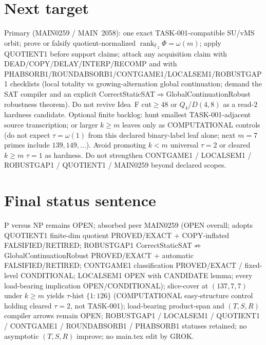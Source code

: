 \documentclass[11pt]{article}
\begin{document}
\section*{Next target}
Primary (MAIN0259 / MAIN~2058): one exact TASK-001-compatible SU/vMS orbit; prove or falsify
quotient-normalized $\operatorname{rank}_{\mathbb F_2}\Phi=\omega(m)$; apply QUOTIENT1 before support claims;
attack any acquisition claim with
DEAD/COPY/DELAY/INTERP/RECOMP and with PHABSORB1/ROUNDABSORB1/CONTGAME1/LOCALSEM1/ROBUSTGAP1 checklists
(local totality vs growing-alternation global continuation; demand the SAT compiler and an
explicit CorrectStaticSAT$\Rightarrow$GlobalContinuationRobust robustness theorem).
Do not revive Idea~F cut$\ge48$ or $Q_4$/$D(4,8)$ as a read-$2$ hardness candidate.
Optional finite backlog: hunt smallest TASK-001-adjacent source transcription;
or larger $k{\ge}m$ leaves only as COMPUTATIONAL controls (do not expect $\tau=\omega(1)$
from this declared binary-label leaf alone; next $m{=}7$ primes include $139,149,\ldots$).
Avoid promoting $k{<}m$ universal $\tau{=}2$ or cleared $k{\ge}m$ $\tau{=}1$ as hardness.
Do not strengthen CONTGAME1 / LOCALSEM1 / ROBUSTGAP1 / QUOTIENT1 / MAIN0259 beyond declared scopes.

\section*{Final status sentence}
P versus NP remains OPEN; absorbed peer MAIN0259 (OPEN overall; adopts QUOTIENT1 finite-dim quotient PROVED/EXACT + COPY-inflated FALSIFIED/RETIRED; ROBUSTGAP1 CorrectStaticSAT$\not\Rightarrow$GlobalContinuationRobust PROVED/EXACT + automatic FALSIFIED/RETIRED; CONTGAME1 classification PROVED/EXACT / fixed-level CONDITIONAL; LOCALSEM1 OPEN with CANDIDATE lemma; every load-bearing implication OPEN/CONDITIONAL); slice-cover at $(137,7,7)$ under $k{\ge}m$ yields $\tau$-hist $\{1{:}126\}$ (COMPUTATIONAL easy-structure control holding cleared $\tau{=}2$, not TASK-001); load-bearing product-span and $(T,S,R)$ compiler arrows remain OPEN; ROBUSTGAP1 / LOCALSEM1 / QUOTIENT1 / CONTGAME1 / ROUNDABSORB1 / PHABSORB1 statuses retained; no asymptotic $(T,S,R)$ improve; no main.tex edit by GROK.
\end{document}
